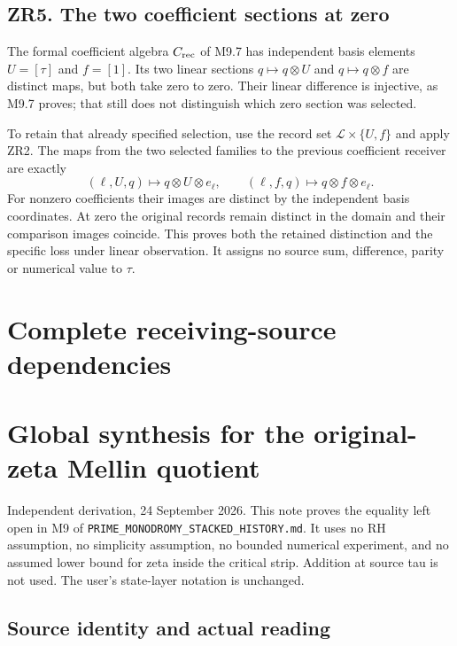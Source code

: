 \documentclass[
]{article}
\begin{document}
\subsection{ZR5. The two coefficient sections at
zero}\label{zr5.-the-two-coefficient-sections-at-zero}

The formal coefficient algebra \(C_{\rm rec}\) of M9.7 has independent
basis elements \(U=[\tau]\) and \(f=[1]\). Its two linear sections
\(q\mapsto q\otimes U\) and \(q\mapsto q\otimes f\) are distinct maps,
but both take zero to zero. Their linear difference is injective, as
M9.7 proves; that still does not distinguish which zero section was
selected.

To retain that already specified selection, use the record set
\(\mathcal L\times\{U,f\}\) and apply ZR2. The maps from the two
selected families to the previous coefficient receiver are exactly \[
(\ell,U,q)\longmapsto q\otimes U\otimes e_\ell,
\qquad
(\ell,f,q)\longmapsto q\otimes f\otimes e_\ell.
\tag{ZR5.1}
\] For nonzero coefficients their images are distinct by the independent
basis coordinates. At zero the original records remain distinct in the
domain and their comparison images coincide. This proves both the
retained distinction and the specific loss under linear observation. It
assigns no source sum, difference, parity or numerical value to
\(\tau\).

\section{Complete receiving-source
dependencies}\label{complete-receiving-source-dependencies}

\section{Global synthesis for the original-zeta Mellin
quotient}\label{global-synthesis-for-the-original-zeta-mellin-quotient}

Independent derivation, 24 September 2026. This note proves the equality
left open in M9 of \nolinkurl{PRIME_MONODROMY_STACKED_HISTORY.md}. It
uses no RH assumption, no simplicity assumption, no bounded numerical
experiment, and no assumed lower bound for zeta inside the critical
strip. Addition at source tau is not used. The user's state-layer
notation is unchanged.

\subsection{Source identity and actual
reading}\label{source-identity-and-actual-reading}
\end{document}
